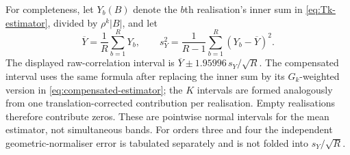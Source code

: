 For completeness, let $Y_b(B)$ denote the $b$th realisation's inner sum in
\eqref{eq:Tk-estimator}, divided by $\rho^k|B|$, and let
\[
 \overline Y=\frac1R\sum_{b=1}^R Y_b,\qquad
 s_Y^2=\frac1{R-1}\sum_{b=1}^R(Y_b-\overline Y)^2.
\]
The displayed raw-correlation interval is
$\overline Y\pm1.95996\,s_Y/\sqrt R$.  The compensated interval uses the same
formula after replacing the inner sum by its $G_k$-weighted version in
\eqref{eq:compensated-estimator}; the $K$ intervals are formed analogously from
one translation-corrected contribution per realisation. Empty realisations
therefore contribute zeros. These are pointwise normal intervals for the mean
estimator, not simultaneous bands. For orders three and four the independent
geometric-normaliser error is tabulated separately and is not folded into
$s_Y/\sqrt R$.
